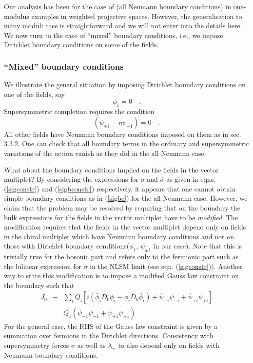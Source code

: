 \documentclass[a4paper,12pt]{article}
\begin{document}
Our analysis has been for the case of (all Neumann
boundary conditions) in one-modulus examples
in weighted projective spaces. However, the generalisation to many moduli
case is straightforward and we will not enter into the details here.
We now turn to the case of ``mixed'' boundary conditions, i.e., we
impose Dirichlet boundary conditions on some of the fields.

\subsubsection{``Mixed'' boundary conditions}

We illustrate the general situation by imposing  Dirichlet boundary
conditions on one of the fields, say 
$$
\phi_1=0\quad.
$$ 
Supersymmetric completion requires the condition 
$$
(\psi_{+1} - \eta \psi_{-1})=0\quad.
$$
All other fields have Neumann boundary conditions imposed on them as
in sec. 3.3.2. One can check that all boundary terms in the 
ordinary and supersymmetric variations of the action vanish
as they did in the all Neumann case.

What about the boundary conditions implied on the fields in the vector
multiplet? By considering the expressions for $\sigma$ and
$\overline{\sigma}$ as given in eqns. (\ref{sigconstr}) and
(\ref{sigbconstr}) respectively, it appears that one  cannot
obtain simple boundary conditions as in (\ref{sigbc}) for the all
Neumann case. However, we claim that the problem may be resolved
by requiring that on the boundary the bulk expressions for the
fields in the vector multiplet have to be {\it modified}.
The modification requires that the fields in the vector multiplet
depend only on fields in the chiral multiplet which
have Neumann boundary conditions and not on those with Dirichlet
boundary conditions($\phi_1$, $\psi_{\pm1}$ in our case). 
Note that this is trivially true for the
bosonic part and refers only to the fermionic part such as the bilinear
expression for $\sigma$ in the NLSM limit (see eqn. 
(\ref{sigconstr})). Another way to state this modification is to impose
a modified Gauss law constraint on the boundary such that
\begin{eqnarray}
J_0 &\equiv& 
\sum_i Q_i\left[
i (\overline{\phi}_i D_0 \phi_i - \phi_i D_0
\overline{\phi}_i) +
\overline{\psi}_{-i} \psi_{-i} + \overline{\psi}_{+i} \psi_{+i} \right]
\nonumber \\
&=&Q_1(\overline{\psi}_{-1} \psi_{-1} + \overline{\psi}_{+1} \psi_{+1})
\end{eqnarray}
For the general case, the RHS of the Gauss law constraint  is given by
a summation over fermions in the Dirichlet directions.
Consistency with supersymmetry forces $\sigma$ as
well as $\lambda_\pm$ to also depend only on fields with Neumann
boundary conditions.
\end{document}
